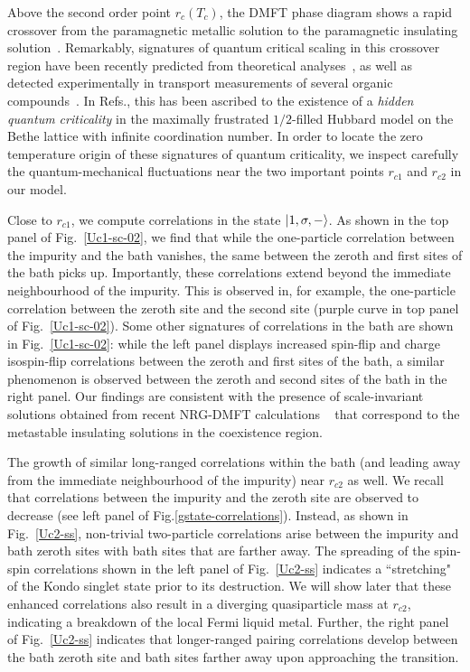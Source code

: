 \documentclass{iopart}
\begin{document}
Above the second order point \(r_c(T_c)\), the DMFT phase diagram shows a rapid crossover from the paramagnetic metallic solution to the paramagnetic insulating solution~\cite{georges1996,limelette_2003}. Remarkably, signatures of quantum critical scaling in this crossover region have been recently predicted from theoretical analyses~\cite{terletska_mott_2011,vucicevic_2013}, as well as detected experimentally in transport measurements of several organic compounds~\cite{Kagawa2005,Furukawa2015}. In Refs.\cite{terletska_mott_2011,vucicevic_2013}, this has been ascribed to the existence of a \textit{hidden quantum criticality} in the maximally frustrated $1/2$-filled Hubbard model on the Bethe lattice with infinite coordination number. In order to locate the zero temperature origin of these signatures of quantum criticality, we inspect carefully the quantum-mechanical fluctuations near the two important points \(r_{c1}\) and \(r_{c2}\) in our model.

Close to \(r_{c1}\), we compute correlations in the state \(\ket{1,\sigma,-}\).
As shown in the top panel of Fig.~\eqref{Uc1-sc-02}, we find that while the one-particle correlation between the impurity and the bath vanishes, the same between the zeroth and first sites of the bath picks up. Importantly, these correlations extend beyond the immediate neighbourhood of the impurity. This is observed in, for example, the one-particle correlation between the zeroth site and the second site (purple curve in top panel of Fig.~\eqref{Uc1-sc-02}). Some other signatures of correlations in the bath are shown in Fig.~\eqref{Uc1-sc-02}: while the left panel displays increased spin-flip and charge isospin-flip correlations between the zeroth and first sites of the bath, a similar phenomenon is observed between the zeroth and second sites of the bath in the right panel. 
Our findings are consistent with the presence of scale-invariant solutions obtained from recent NRG-DMFT calculations ~\cite{Eisenlohr_2019} that correspond to the metastable insulating solutions in the coexistence region.

The growth of similar long-ranged correlations within the bath (and leading away from the immediate neighbourhood of the impurity) 
near \(r_{c2}\) as well.
We recall that correlations between the impurity and the zeroth site are observed to decrease (see left panel of Fig.\eqref{gstate-correlations}).
Instead, as shown in Fig.~\eqref{Uc2-ss}, non-trivial two-particle correlations arise between the impurity and bath zeroth sites with bath sites that are farther away.
The spreading of the spin-spin correlations shown in the left panel of Fig.~\eqref{Uc2-ss} indicates a ``stretching" of the Kondo singlet state prior to its destruction. We will show later that these enhanced correlations also result in a diverging quasiparticle mass at \(r_{c2}\), indicating a breakdown of the local Fermi liquid metal. Further, the right panel of Fig.~\eqref{Uc2-ss} indicates that longer-ranged pairing correlations develop between the bath zeroth site and bath sites farther away upon approaching the transition.
\end{document}
